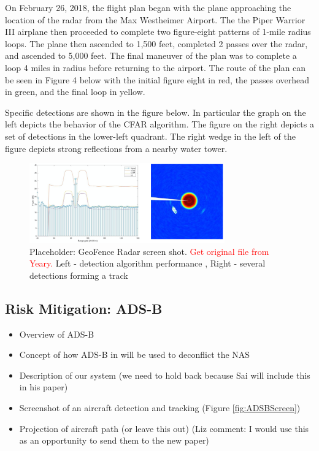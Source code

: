 \documentclass[sensors,review,submit,moreauthors,pdftex,10pt,a4paper]{mdpi}
\theoremstyle{mdpi}
\newcounter{thm}
\newcounter{ex}
\newcounter{re}
\theoremstyle{mdpidefinition}
\begin{document}
On February 26, 2018, the flight plan began with the plane approaching the location of the radar from the Max Westheimer Airport. The the Piper Warrior III airplane then proceeded to complete two figure-eight patterns of 1-mile radius loops. The plane then ascended to 1,500 feet, completed 2 passes over the radar, and ascended to 5,000 feet. The final maneuver of the plan was to complete a loop 4 miles in radius before returning to the airport. The route of the plan can be seen in Figure 4 below with the initial figure eight in red, the passes overhead in green, and the final loop in yellow. 

Specific detections are shown in the figure below.  In particular the graph on the left depicts the behavior of the CFAR algorithm.  The figure on the right depicts a set of detections in the lower-left quadrant.  The right wedge in the left of the figure depicts strong reflections from a nearby water tower.

\begin{figure}
\centering
\includegraphics[angle=0, width=0.75\textwidth]{figures/GeoFenceData.pdf}
\caption{\label{fig:GeoFenceRadarScreen} Placeholder: GeoFence Radar screen shot. \textcolor{red}{Get original file from Yeary.} Left - detection algorithm performance , Right - several detections forming a track}
\end{figure}

\subsection{Risk Mitigation: ADS-B}
\begin{itemize}[leftmargin=*,labelsep=4mm]
\color{blue}
\item	Overview of ADS-B
\item	Concept of how ADS-B in will be used to deconflict the NAS
\item	Description of our system (we need to hold back because Sai will include this in his paper)
\item	Screenshot of an aircraft detection and tracking (Figure \ref{fig:ADSBScreen})
\item	Projection of aircraft path (or leave this out) (Liz comment: I would use this as an opportunity to send them to the new paper)
\end{itemize}
\end{document}
